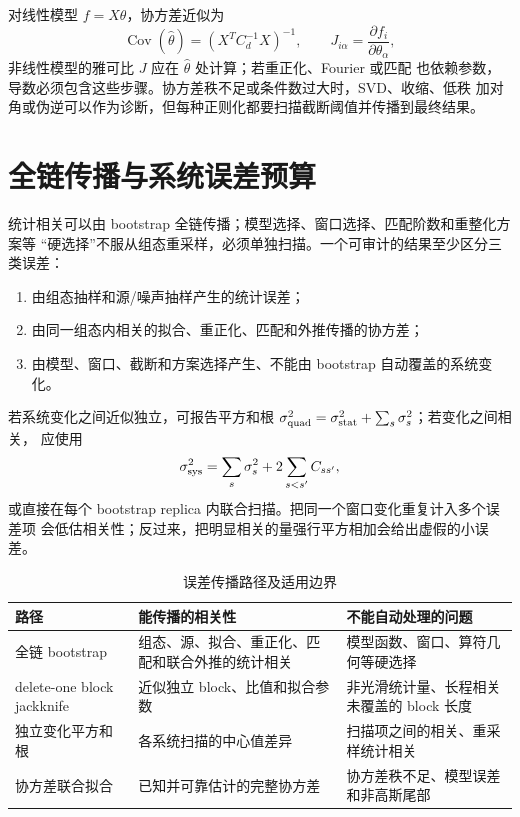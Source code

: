 对线性模型 \(f=X\theta\)，协方差近似为
\begin{equation}
  \operatorname{Cov}(\hat\theta)
  =\left(X^TC_d^{-1}X\right)^{-1},
  \qquad
  J_{i\alpha}=\frac{\partial f_i}{\partial\theta_\alpha},
  \label{eq:b03-gls-cov}
\end{equation}
非线性模型的雅可比 \(J\) 应在 \(\hat\theta\) 处计算；若重正化、Fourier 或匹配
也依赖参数，导数必须包含这些步骤。协方差秩不足或条件数过大时，SVD、收缩、低秩
加对角或伪逆可以作为诊断，但每种正则化都要扫描截断阈值并传播到最终结果。

\section{全链传播与系统误差预算}

统计相关可以由 bootstrap 全链传播；模型选择、窗口选择、匹配阶数和重整化方案等
“硬选择”不服从组态重采样，必须单独扫描。一个可审计的结果至少区分三类误差：
\begin{enumerate}
  \item 由组态抽样和源/噪声抽样产生的统计误差；
  \item 由同一组态内相关的拟合、重正化、匹配和外推传播的协方差；
  \item 由模型、窗口、截断和方案选择产生、不能由 bootstrap 自动覆盖的系统变化。
\end{enumerate}
若系统变化之间近似独立，可报告平方和根
\(\sigma_{\rm quad}^2=\sigma_{\rm stat}^2+\sum_s\sigma_s^2\)；若变化之间相关，
应使用
\begin{equation}
  \sigma_{\rm sys}^2=\sum_s\sigma_s^2+2\sum_{s<s'}C_{ss'},
  \label{eq:b03-system-cov}
\end{equation}
或直接在每个 bootstrap replica 内联合扫描。把同一个窗口变化重复计入多个误差项
会低估相关性；反过来，把明显相关的量强行平方相加会给出虚假的小误差。

\begin{table}[htbp]
\centering
\caption{误差传播路径及适用边界}
\label{tab:b03-error-paths}
\begin{tabularx}{\textwidth}{@{}>{\raggedright\arraybackslash}p{}X X@{}}
\toprule
路径 & 能传播的相关性 & 不能自动处理的问题 \\
\midrule
全链 bootstrap & 组态、源、拟合、重正化、匹配和联合外推的统计相关 & 模型函数、窗口、算符几何等硬选择 \\
delete-one block jackknife & 近似独立 block、比值和拟合参数 & 非光滑统计量、长程相关未覆盖的 block 长度 \\
独立变化平方和根 & 各系统扫描的中心值差异 & 扫描项之间的相关、重采样统计相关 \\
协方差联合拟合 & 已知并可靠估计的完整协方差 & 协方差秩不足、模型误差和非高斯尾部 \\
\bottomrule
\end{tabularx}
\end{table}

